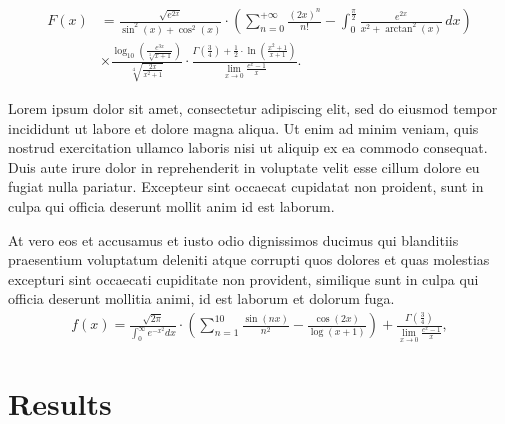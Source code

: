 \documentclass[a0,portrait]{a0poster}
\begin{document}
\begin{mdframed}[style=MyFrame]
\begin{multicols}{2}
\begin{align}
    F(x) &= \frac{\sqrt{e^{2x}}}{\sin^2(x) + \cos^2(x)} \cdot \left(\sum_{n=0}^{+\infty} \frac{(2x)^n}{n!} - \int_{0}^{\frac{\pi}{2}} \frac{e^{2x}}{x^2 + \arctan^2(x)} \, dx\right) \nonumber \\
        &\times\frac{\log_{10}\left(\frac{e^{3x}}{\sqrt[3]{x+1}}\right)}{\sqrt[4]{\frac{2x}{x^2 + 1}}} \cdot \frac{\Gamma\left(\frac{3}{4}\right) + \frac{1}{2} \cdot \ln\left(\frac{x^2 + 1}{x+1}\right)}{\lim_{{x \to 0}} \frac{e^x - 1}{x}}.
\end{align}

Lorem ipsum dolor sit amet, consectetur adipiscing elit, sed do eiusmod tempor incididunt ut labore et dolore magna aliqua. Ut enim ad minim veniam, quis nostrud exercitation ullamco laboris nisi ut aliquip ex ea commodo consequat. Duis aute irure dolor in reprehenderit in voluptate velit esse cillum dolore eu fugiat nulla pariatur. Excepteur sint occaecat cupidatat non proident, sunt in culpa qui officia deserunt mollit anim id est laborum.

At vero eos et accusamus et iusto odio dignissimos ducimus qui blanditiis praesentium voluptatum deleniti atque corrupti quos dolores et quas molestias excepturi sint occaecati cupiditate non provident, similique sunt in culpa qui officia deserunt mollitia animi, id est laborum et dolorum fuga.
%
\begin{equation}\label{eqn:L1}
\begin{split}
	f(x) = \frac{\sqrt{2 \pi}}{\int_{0}^{\infty} e^{-x^2} dx} \cdot \left(\sum_{n=1}^{10} \frac{\sin(nx)}{n^2} - \frac{\cos(2x)}{\log(x+1)}\right) + \frac{\Gamma\left(\frac{3}{4}\right)}{\lim_{{x \to 0}} \frac{e^x - 1}{x}},
\end{split}
\end{equation}

\section{Results}\label{section4}


\end{multicols}
\end{mdframed}
\end{document}
